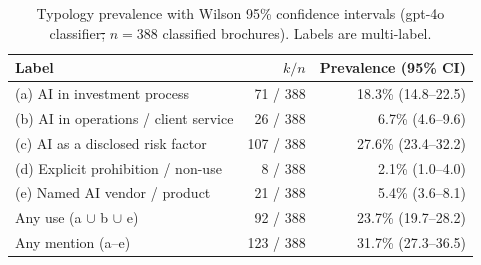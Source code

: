 \documentclass[utf8]{FrontiersinHarvard}
\makeatletter
\providecommand{\DIFaddtex}[1]{{\protect\color{blue}\uwave{#1}}} %
\providecommand{\DIFdeltex}[1]{{\protect\color{red}\sout{#1}}} %
\providecommand{\DIFaddFL}[1]{\DIFadd{#1}} %
\providecommand{\DIFdelFL}[1]{\DIFdel{#1}} %
\providecommand{\DIFaddbeginFL}{} %
\providecommand{\DIFaddendFL}{} %
\providecommand{\DIFdelbeginFL}{} %
\providecommand{\DIFdelendFL}{} %
\providecommand{\DIFadd}[1]{\texorpdfstring{\DIFaddtex{#1}}{#1}} %
\providecommand{\DIFdel}[1]{\texorpdfstring{\DIFdeltex{#1}}{}} %
\let\sout@orig\sout %
\renewcommand{\sout}[1]{\ifmmode\text{\sout@orig{\ensuremath{#1}}}\else\sout@orig{#1}\fi} %
\makeatother
\begin{document}




\begin{table}[h!]
\caption{Typology prevalence with Wilson 95\% confidence intervals (gpt-4o classifier\DIFdelbeginFL \DIFdelFL{; }\DIFdelendFL \DIFaddbeginFL \DIFaddFL{, }\DIFaddendFL $n = 388$ classified brochures). Labels are multi-label.}
\label{tab:typology}
\centering
\begin{tabular}{lrr}
\toprule
Label & $k / n$ & Prevalence (95\% CI) \\
\midrule
(a) AI in investment process & 71 / 388 & 18.3\% (14.8--22.5) \\
(b) AI in operations / client service & 26 / 388 & 6.7\% (4.6--9.6) \\
(c) AI as a disclosed risk factor & 107 / 388 & 27.6\% (23.4--32.2) \\
(d) Explicit prohibition / non-use & 8 / 388 & 2.1\% (1.0--4.0) \\
(e) Named AI vendor / product & 21 / 388 & 5.4\% (3.6--8.1) \\
Any use (a $\cup$ b $\cup$ e) & 92 / 388 & 23.7\% (19.7--28.2) \\
Any mention (a--e) & 123 / 388 & 31.7\% (27.3--36.5) \\
\bottomrule
\end{tabular}
\end{table}
\end{document}
